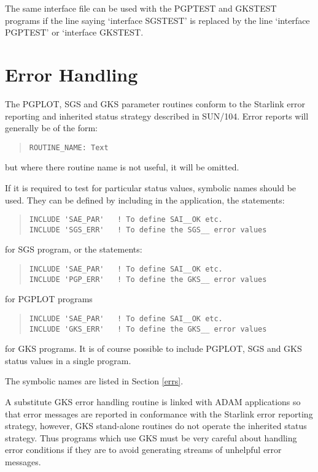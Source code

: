 The same interface file can be used with the PGPTEST and GKSTEST programs if
the line saying `interface SGSTEST' is replaced by the line `interface
PGPTEST' or `interface GKSTEST.

\section{Error Handling}
\label{errhnd}
The PGPLOT, SGS and GKS parameter routines conform to the Starlink error 
reporting and inherited status strategy described in SUN/104.
Error reports will generally be of the form:
\begin{quote}
\begin{verbatim}
ROUTINE_NAME: Text
\end{verbatim}
\end{quote}
but where there routine name is not useful, it will be omitted.

If it is required to test for particular status values, symbolic names should
be used. They can be defined by including in the application, the statements:

\begin{quote}
\begin{verbatim}
INCLUDE 'SAE_PAR'   ! To define SAI__OK etc.
INCLUDE 'SGS_ERR'   ! To define the SGS__ error values
\end{verbatim}
\end{quote}

for SGS program, or the statements:

\begin{quote}
\begin{verbatim}
INCLUDE 'SAE_PAR'   ! To define SAI__OK etc.
INCLUDE 'PGP_ERR'   ! To define the GKS__ error values
\end{verbatim}
\end{quote}

for PGPLOT programs\begin{quote}

\begin{verbatim}
INCLUDE 'SAE_PAR'   ! To define SAI__OK etc.
INCLUDE 'GKS_ERR'   ! To define the GKS__ error values
\end{verbatim}
\end{quote}

for GKS programs. It is of course possible to include PGPLOT, SGS and GKS
status values in a single program.

The symbolic names are listed in Section \ref{errs}.

A substitute GKS error handling routine is linked with ADAM applications so
that error messages are reported in conformance with the Starlink error
reporting strategy, however, GKS stand-alone routines do not operate the
inherited status strategy. Thus programs which use GKS must be very careful
about handling error conditions if they are to avoid generating streams
of unhelpful error messages.

